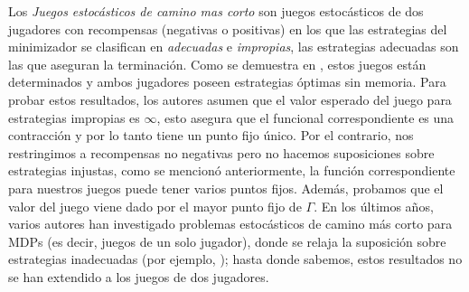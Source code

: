 

















Los \emph{Juegos estocásticos de camino mas corto} \cite{PatekBertsekas99} son juegos estocásticos de dos jugadores con recompensas (negativas o positivas) en los que las estrategias del minimizador se clasifican en \emph{adecuadas} e \emph{impropias},
las estrategias adecuadas son las que aseguran la terminación. Como se demuestra en \cite{PatekBertsekas99}, estos juegos están determinados y ambos jugadores poseen estrategias óptimas sin memoria. Para probar estos resultados, los autores asumen que el valor esperado del juego para estrategias impropias es $\infty$, esto asegura que el funcional correspondiente es una contracción y por lo tanto tiene un punto fijo único. Por el contrario, nos restringimos a recompensas no negativas pero no hacemos suposiciones sobre estrategias injustas, como se mencionó anteriormente, la función correspondiente para nuestros juegos puede tener varios puntos fijos. Además, probamos que el valor del juego viene dado por el mayor punto fijo de $\Gamma$. En los últimos años, varios autores han investigado problemas estocásticos de camino más corto para MDPs (es decir, juegos de un solo jugador), donde se relaja la suposición sobre estrategias inadecuadas (por ejemplo, \cite{DBLP:conf/lics/Baier0DGS18}); hasta donde sabemos, estos resultados no se han extendido a los juegos de dos jugadores.

	
